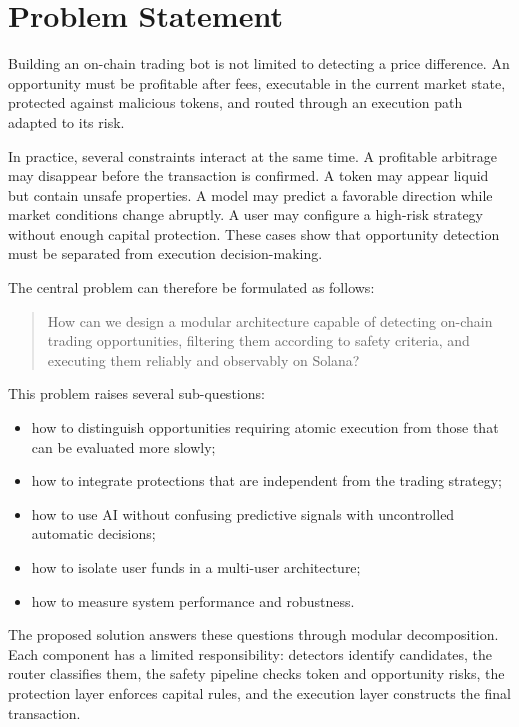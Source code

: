 \documentclass[12pt,a4paper]{report}
\begin{document}
\section{Problem Statement}

Building an on-chain trading bot is not limited to detecting a price difference. An opportunity must be profitable after fees, executable in the current market state, protected against malicious tokens, and routed through an execution path adapted to its risk.

In practice, several constraints interact at the same time. A profitable arbitrage may disappear before the transaction is confirmed. A token may appear liquid but contain unsafe properties. A model may predict a favorable direction while market conditions change abruptly. A user may configure a high-risk strategy without enough capital protection. These cases show that opportunity detection must be separated from execution decision-making.

The central problem can therefore be formulated as follows:

\begin{quote}
How can we design a modular architecture capable of detecting on-chain trading opportunities, filtering them according to safety criteria, and executing them reliably and observably on Solana?
\end{quote}

This problem raises several sub-questions:
\begin{itemize}
    \item how to distinguish opportunities requiring atomic execution from those that can be evaluated more slowly;
    \item how to integrate protections that are independent from the trading strategy;
    \item how to use AI without confusing predictive signals with uncontrolled automatic decisions;
    \item how to isolate user funds in a multi-user architecture;
    \item how to measure system performance and robustness.
\end{itemize}

The proposed solution answers these questions through modular decomposition. Each component has a limited responsibility: detectors identify candidates, the router classifies them, the safety pipeline checks token and opportunity risks, the protection layer enforces capital rules, and the execution layer constructs the final transaction.
\end{document}
